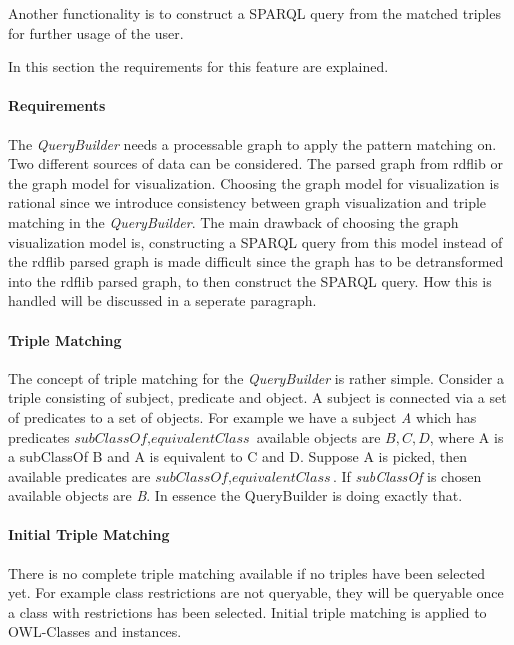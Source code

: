 Another functionality is to construct a SPARQL query from the matched triples for further usage of the user. 

In this section the requirements for this feature are explained.

\paragraph{Requirements}

The \textit{QueryBuilder} needs a processable graph to apply the pattern matching on. 
Two different sources of data can be considered. The parsed graph from rdflib or the graph model for visualization.
Choosing the graph model for visualization is rational since we introduce consistency between graph visualization and
triple matching in the \textit{QueryBuilder}. The main drawback of choosing the graph visualization model is, constructing a
SPARQL query from this model instead of the rdflib parsed graph is made difficult since the graph has to be detransformed into the rdflib parsed graph, to then construct the 
SPARQL query. How this is handled will be discussed in a seperate paragraph. 


\paragraph{Triple Matching}
The concept of triple matching for the \textit{QueryBuilder} is rather simple.
Consider a triple consisting of subject, predicate and object.
A subject is connected via a set of predicates to a set of objects. 
For example we have a subject \textit{A} which has predicates ${\textit{subClassOf}, \textit{equivalentClass}}$
available objects are ${\textit{B}, \textit{C}, \textit{D}}$, where A is a subClassOf B and A is equivalent to C and D. 
Suppose A is picked, then available predicates are ${\textit{subClassOf}, \textit{equivalentClass}}$.
If \textit{subClassOf} is chosen available objects are \textit{B}.
In essence the QueryBuilder is doing exactly that.



\paragraph{Initial Triple Matching}
There is no complete triple matching available if no triples have been selected yet. For example class restrictions are not queryable, they will be queryable once a class
with restrictions has been selected. Initial triple matching is applied to OWL-Classes and instances.

